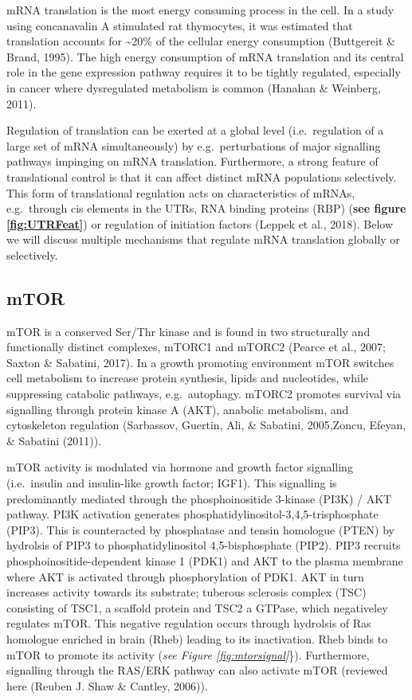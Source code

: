 \documentclass[12pt,openany]{book}
\begin{document}
mRNA translation is the most energy consuming process in the cell. In a
study using concanavalin A stimulated rat thymocytes, it was estimated
that translation accounts for \textasciitilde{}20\% of the cellular
energy consumption (Buttgereit \& Brand, 1995). The high energy
consumption of mRNA translation and its central role in the gene
expression pathway requires it to be tightly regulated, especially in
cancer where dysregulated metabolism is common (Hanahan \& Weinberg,
2011).

Regulation of translation can be exerted at a global level
(i.e.~regulation of a large set of mRNA simultaneously) by
e.g.~perturbations of major signalling pathways impinging on mRNA
translation. Furthermore, a strong feature of translational control is
that it can affect distinct mRNA populations selectively. This form of
translational regulation acts on characteristics of mRNAs, e.g.~through
cis elements in the UTRs, RNA binding proteins (RBP) (\textbf{see figure
\ref{fig:UTRFeat}}) or regulation of initiation factors (Leppek et al.,
2018). Below we will discuss multiple mechanisms that regulate mRNA
translation globally or selectively.

\subsection{mTOR} \label{mTOR}

mTOR is a conserved Ser/Thr kinase and is found in two structurally and
functionally distinct complexes, mTORC1 and mTORC2 (Pearce et al., 2007;
Saxton \& Sabatini, 2017). In a growth promoting environment mTOR
switches cell metabolism to increase protein synthesis, lipids and
nucleotides, while suppressing catabolic pathways, e.g.~autophagy.
mTORC2 promotes survival via signalling through protein kinase A (AKT),
anabolic metabolism, and cytoskeleton regulation (Sarbassov, Guertin,
Ali, \& Sabatini, 2005,Zoncu, Efeyan, \& Sabatini (2011)).

mTOR activity is modulated via hormone and growth factor signalling
(i.e.~insulin and insulin-like growth factor; IGF1). This signalling is
predominantly mediated through the phosphoinositide 3-kinase (PI3K) /
AKT pathway. PI3K activation generates
phosphatidylinositol-3,4,5-trisphosphate (PIP3). This is counteracted by
phosphatase and tensin homologue (PTEN) by hydrolsis of PIP3 to
phosphatidylinositol 4,5-bisphosphate (PIP2). PIP3 recruits
phosphoinositide-dependent kinase 1 (PDK1) and AKT to the plasma
membrane where AKT is activated through phosphorylation of PDK1. AKT in
turn increases activity towards its substrate; tuberous sclerosis
complex (TSC) consisting of TSC1, a scaffold protein and TSC2 a GTPase,
which negativeley regulates mTOR. This negative regulation occurs
through hydrolsis of Ras homologue enriched in brain (Rheb) leading to
its inactivation. Rheb binds to mTOR to promote its activity (\emph{see
Figure \ref{fig:mtorsignal}}\}). Furthermore, signalling through the
RAS/ERK pathway can also activate mTOR (reviewed here (Reuben J. Shaw \&
Cantley, 2006)).\\
\end{document}
